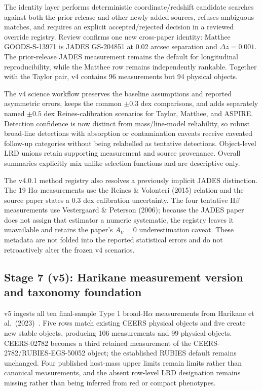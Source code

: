 \documentclass[11pt]{article}
\begin{document}
The identity layer performs deterministic coordinate/redshift candidate searches against both the prior release and other newly added sources, refuses ambiguous matches, and requires an explicit accepted/rejected decision in a reviewed override registry. Review confirms one new cross-paper identity: Matthee GOODS-S-13971 is JADES GS-204851 at 0.02 arcsec separation and $\Delta z=0.001$. The prior-release JADES measurement remains the default for longitudinal reproducibility, while the Matthee row remains independently rankable. Together with the Taylor pair, v4 contains 96 measurements but 94 physical objects.

The v4 science workflow preserves the baseline assumptions and reported asymmetric errors, keeps the common $\pm0.3$ dex comparisons, and adds separately named $\pm0.5$ dex Reines-calibration scenarios for Taylor, Matthee, and ASPIRE. Detection confidence is now distinct from mass/line-model reliability, so robust broad-line detections with absorption or contamination caveats receive caveated follow-up categories without being relabelled as tentative detections. Object-level LRD unions retain supporting measurement and source provenance. Overall summaries explicitly mix unlike selection functions and are descriptive only.

The v4.0.1 method registry also resolves a previously implicit JADES distinction. The 19 H$\alpha$ measurements use the Reines \& Volonteri (2015) relation and the source paper states a 0.3 dex calibration uncertainty. The four tentative H$\beta$ measurements use Vestergaard \& Peterson (2006); because the JADES paper does not assign that estimator a numeric systematic, the registry leaves it unavailable and retains the paper's $A_V=0$ underestimation caveat. These metadata are not folded into the reported statistical errors and do not retroactively alter the frozen v4 scenarios.

\subsection{Stage 7 (v5): Harikane measurement version and taxonomy foundation}

v5 ingests all ten final-sample Type 1 broad-H$\alpha$ measurements from Harikane et al.\ (2023)~\cite{harikane2023}. Five rows match existing CEERS physical objects and five create new stable objects, producing 106 measurements and 99 physical objects. CEERS-02782 becomes a third retained measurement of the CEERS-2782/RUBIES-EGS-50052 object; the established RUBIES default remains unchanged. Four published host-mass upper limits remain limits rather than canonical measurements, and the absent row-level LRD designation remains missing rather than being inferred from red or compact phenotypes.
\end{document}
